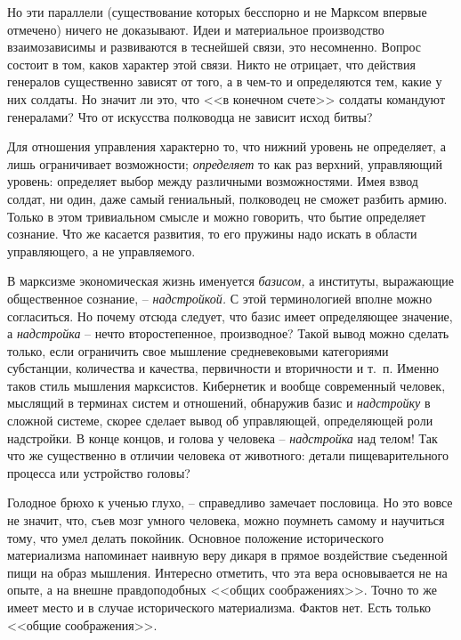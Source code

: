 \documentclass{book}
\begin{document}
Но эти параллели (существование которых бесспорно и не Марксом впервые отмечено) ничего не доказывают. Идеи и мате­риальное 
производство взаимозависимы и развиваются в тес­нейшей связи, это несомненно. Вопрос состоит в том, каков ха­рактер этой связи. 
Никто не отрицает, что действия генералов существенно зависят от того, а в чем-то и определяются тем, ка­кие у них солдаты. Но 
значит ли это, что <<в конечном счете>> сол­даты командуют генералами? Что от искусства полководца не зависит исход битвы?

Для отношения управления характерно то, что нижний уро­вень не определяет, а лишь ограничивает возможности; \textit{определяет} 
то  как раз верхний, управляющий уровень: определяет выбор между различными возможностями. Имея взвод солдат, ни один, даже 
самый гениальный, полководец не сможет разбить армию. Только в этом тривиальном смысле и можно говорить, что бытие определяет 
сознание. Что же касается развития, то его пружины надо искать в области управляющего, а не управляемого.

В марксизме экономическая жизнь именуется \textit{базисом,} а институты, выражающие общественное сознание, -- 
\textit{надстройкой.} С этой терминологией вполне можно согласиться. Но почему отсюда следует, что базис имеет определяющее 
значение, а \textit{надстройка} -- нечто второстепенное, производное? Такой вывод можно сделать только, если ограничить свое 
мышление средневековыми категориями субстанции, количества и качества, первичности и вторичности и т.~п. Именно таков стиль 
мышления марксистов. Кибернетик и вообще современный человек, мыслящий в терминах систем и отношений, обнаружив базис  и 
\textit{надстройку}  в сложной системе, скорее сделает вывод об управляющей, определяющей роли надстройки.  В конце концов, и 
голова у человека -- \textit{надстройка}  над телом! Так что же существенно в отличии человека от животного: детали 
пищеварительного процесса или устройство головы?

Голодное брюхо к ученью глухо, -- справедливо замечает по­словица. Но это вовсе не значит, что, съев мозг умного человека, можно 
поумнеть самому и научиться тому, что умел делать по­койник. Основное положение исторического материализма на­поминает наивную 
веру дикаря в прямое воздействие съеденной пищи на образ мышления. Интересно отметить, что эта вера ос­новывается не на опыте, а 
на внешне правдоподобных <<общих соображениях>>. Точно то же имеет место и в случае историче­ского материализма. Фактов нет. Есть 
только <<общие сообра­жения>>.
\end{document}
